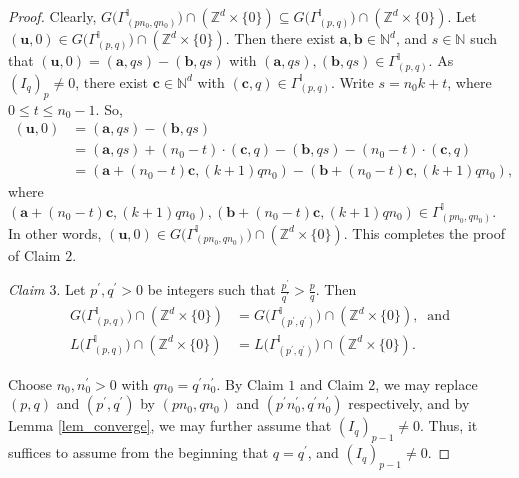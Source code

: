 \documentclass[12pt,a4paper]{amsart}
\theoremstyle{plain}
\theoremstyle{definition}
\numberwithin{equation}{theorem}
\begin{document}
\begin{proof}
Clearly, $G\big(\Gamma^{\mathbb{I}}_{(pn_0,qn_0)}\big) \cap \left(\mathbb{Z}^d\times \{0\}\right) \subseteq G\big(\Gamma^{\mathbb{I}}_{(p,q)}\big) \cap \left(\mathbb{Z}^d\times \{0\}\right)$.
Let $(\mathbf{u},0) \in G\big(\Gamma^{\mathbb{I}}_{(p,q)}\big) \cap \left(\mathbb{Z}^d\times \{0\}\right)$. Then there exist $\mathbf{a}, \mathbf{b}\in\mathbb{N}^d$, and $s\in\mathbb{N}$ such that $(\mathbf{u},0) = (\mathbf{a}, qs) - (\mathbf{b}, qs)$ with $(\mathbf{a}, qs), (\mathbf{b}, qs) \in \Gamma^{\mathbb{I}}_{(p,q)}$. As ${(I_q)}_p\neq 0$, there exist $\mathbf{c}\in\mathbb{N}^d$ with $(\mathbf{c},q)\in \Gamma^{\mathbb{I}}_{(p,q)}$. Write $s = n_0k + t$, where $0\leq t\leq n_0-1$. So,
\begin{align*}
 (\mathbf{u},0) &= (\mathbf{a}, qs) - (\mathbf{b}, qs)\\
 &= (\mathbf{a}, qs) + (n_0-t)\cdot (\mathbf{c},q) - (\mathbf{b}, qs) - (n_0-t)\cdot (\mathbf{c},q)\\
 &= (\mathbf{a} + (n_0-t)\mathbf{c}, (k+1)qn_0) - (\mathbf{b} + (n_0-t)\mathbf{c}, (k+1)qn_0),
\end{align*}
where $(\mathbf{a} + (n_0-t)\mathbf{c}, (k+1)qn_0), (\mathbf{b} + (n_0-t)\mathbf{c}, (k+1)qn_0) \in \Gamma^{\mathbb{I}}_{(pn_0,qn_0)}$. In other words, $(\mathbf{u},0) \in G\big(\Gamma^{\mathbb{I}}_{(pn_0,qn_0)}\big) \cap \left(\mathbb{Z}^d\times \{0\}\right)$. This completes the proof of Claim $2$.

\vspace{0.2cm}
\noindent
\emph{Claim $3$}. Let $p^{\prime},q^{\prime}>0$ be integers such that $\frac{p^{\prime}}{q^{\prime}}>\frac{p}{q}$. Then
\begin{align}
G\big(\Gamma^{\mathbb{I}}_{(p,q)}\big) \cap \left(\mathbb{Z}^d\times \{0\}\right) &= G\big(\Gamma^{\mathbb{I}}_{(p^{\prime},q^{\prime})}\big) \cap \left(\mathbb{Z}^d\times \{0\}\right),\;\;\text{and}\label{equal1}\\
L\big(\Gamma^{\mathbb{I}}_{(p,q)}\big) \cap \left(\mathbb{Z}^d\times \{0\}\right) &= L\big(\Gamma^{\mathbb{I}}_{(p^{\prime},q^{\prime})}\big) \cap \left(\mathbb{Z}^d\times \{0\}\right).\label{equal2}
\end{align}

Choose $n_0, n_0^{\prime}>0$ with $qn_0 = q^{\prime}n_0^{\prime}$. By Claim $1$ and Claim $2$, we may replace $(p,q)$ and $(p^{\prime},q^{\prime})$ by $(pn_0,qn_0)$ and $(p^{\prime}n^{\prime}_0,q^{\prime}n^{\prime}_0)$ respectively, and by Lemma \ref{lem_converge}, we may further assume that ${\left(I_{q}\right)}_{p-1} \neq 0$. Thus, it suffices to assume from the beginning that $q=q^{\prime}$, and ${\left(I_{q}\right)}_{p-1} \neq 0$.


\end{proof}
\end{document}
